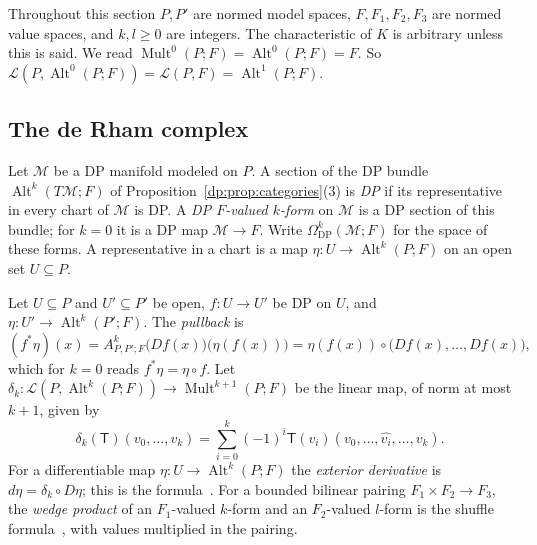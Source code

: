 \documentclass[11pt]{amsart}
\theoremstyle{definition}
\theoremstyle{remark}
\numberwithin{equation}{section}
\newcommand{\cL}{\mathcal L}
\newcommand{\Alt}{\operatorname{Alt}}
\newcommand{\Mult}{\operatorname{Mult}}
\theoremstyle{plain}
\theoremstyle{definition}
\theoremstyle{plain}
\newcommand{\cM}{\mathcal M}
\begin{document}
Throughout this section $P,P'$ are normed model spaces, $F,F_1,F_2,F_3$ are normed value spaces, and $k,l\ge0$ are integers. The characteristic of $K$ is arbitrary unless this is said. We read $\Mult^0(P;F)=\Alt^0(P;F)=F$. So $\cL(P,\Alt^0(P;F))=\cL(P,F)=\Alt^1(P;F)$.

\subsection{The de Rham complex}\label{dp:ssec:de-rham}

Let $\cM$ be a DP manifold modeled on $P$. A section of the DP bundle $\Alt^k(T\cM;F)$ of Proposition~\ref{dp:prop:categories}(3) is \emph{DP} if its representative in every chart of $\cM$ is DP. A \emph{DP $F$-valued $k$-form} on $\cM$ is a DP section of this bundle; for $k=0$ it is a DP map $\cM\to F$. Write $\Omega^k_{\mathrm{DP}}(\cM;F)$ for the space of these forms. A representative in a chart is a map $\eta\colon U\to\Alt^k(P;F)$ on an open set $U\subseteq P$.

Let $U\subseteq P$ and $U'\subseteq P'$ be open, $f\colon U\to U'$ be DP on $U$, and $\eta\colon U'\to\Alt^k(P';F)$. The \emph{pullback} is
\begin{equation}\label{dp:f:pullback}
 (f^*\eta)(x)=A^k_{P,P';F}\bigl(Df(x)\bigr)\bigl(\eta(f(x))\bigr)=\eta(f(x))\circ\bigl(Df(x),\dots,Df(x)\bigr),
\end{equation}
which for $k=0$ reads $f^*\eta=\eta\circ f$. Let $\delta_k\colon\cL(P,\Alt^k(P;F))\to\Mult^{k+1}(P;F)$ be the linear map, of norm at most $k+1$, given by
\[
 \delta_k(\mathsf T)(v_0,\dots,v_k)=\sum_{i=0}^k(-1)^i\mathsf T(v_i)(v_0,\dots,\widehat{v_i},\dots,v_k).
\]
For a differentiable map $\eta\colon U\to\Alt^k(P;F)$ the \emph{exterior derivative} is $d\eta=\delta_k\circ D\eta$; this is the formula~\cite[(10.3)]{I}. For a bounded bilinear pairing $F_1\times F_2\to F_3$, the \emph{wedge product} of an $F_1$-valued $k$-form and an $F_2$-valued $l$-form is the shuffle formula~\cite[(10.2)]{I}, with values multiplied in the pairing.
\end{document}
